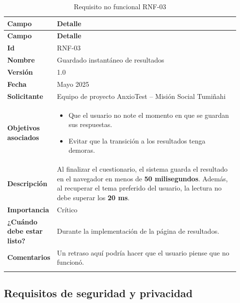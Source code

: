 \begin{longtable}{p{0.15\linewidth} p{0.80\linewidth}}
\toprule
\rowcolor{tableheader!20}
\textbf{Campo} & \textbf{Detalle} \\
\midrule
\endfirsthead
\rowcolor{tableheader!20}
\textbf{Campo} & \textbf{Detalle} \\
\midrule
\endhead
\bottomrule
\endfoot
\textbf{Id} & RNF-03 \\
\textbf{Nombre} & Guardado instantáneo de resultados \\
\textbf{Versión} & 1.0 \\
\textbf{Fecha} & Mayo 2025 \\
\textbf{Solicitante} & Equipo de proyecto AnxioTest – Misión Social Tumiñahi \\
\textbf{Objetivos asociados} & 
  \begin{itemize}
    \item Que el usuario no note el momento en que se guardan sus respuestas.
    \item Evitar que la transición a los resultados tenga demoras.
  \end{itemize} \\
\textbf{Descripción} & Al finalizar el cuestionario, el sistema guarda el resultado en el navegador en menos de \textbf{50 milisegundos}. Además, al recuperar el tema preferido del usuario, la lectura no debe superar los \textbf{20 ms}. \\
\textbf{Importancia} & Crítico \\
\textbf{¿Cuándo debe estar listo?} & Durante la implementación de la página de resultados. \\
\textbf{Comentarios} & Un retraso aquí podría hacer que el usuario piense que no funcionó. \\
\bottomrule
\caption{Requisito no funcional RNF-03}
\end{longtable}

\subsection{Requisitos de seguridad y privacidad}
\label{sec:rnf_seguridad}

